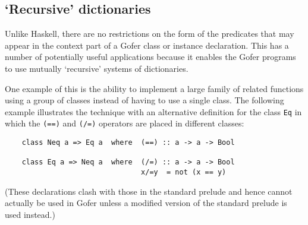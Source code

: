 \subsection{`Recursive' dictionaries}
Unlike Haskell, there are no restrictions on the form of the predicates
that may appear in the context  part  of  a  Gofer  class  or  instance
declaration.  This has a  number  of  potentially  useful  applications
because it enables the  Gofer  programs  to  use  mutually  `recursive'
systems of dictionaries.

One example of this is the ability  to  implement  a  large  family  of
related functions using a group of classes instead of having to  use  a
single class.  The following example illustrates the technique with  an
alternative definition for the class \verb"Eq" 
in  which  the  \verb"(==)"  and  \verb"(/=)"
operators are placed in different classes:
\begin{verbatim}
    class Neq a => Eq a  where  (==) :: a -> a -> Bool

    class Eq a => Neq a  where  (/=) :: a -> a -> Bool
                                x/=y  = not (x == y)
\end{verbatim}
(These declarations clash with those in the standard prelude and
hence cannot actually be used in Gofer unless a modified version of the
standard prelude is used instead.)

